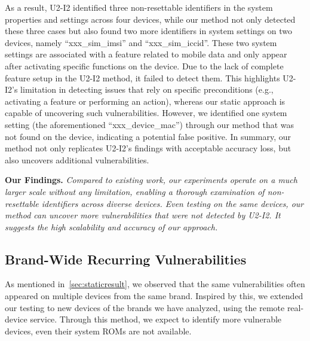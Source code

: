 As a result, U2-I2 identified three non-resettable identifiers in the system properties and settings across four devices, while our method not only detected these three cases but also found two more identifiers in system settings on two devices, namely ``xxx\_sim\_imsi'' and ``xxx\_sim\_iccid''.
These two system settings are associated with a feature related to mobile data and only appear after activating specific functions on the device. 
Due to the lack of complete feature setup in the U2-I2 method, it failed to detect them.
This highlights U2-I2's limitation in detecting issues that rely on specific preconditions (e.g., activating a feature or performing an action), whereas our static approach is capable of uncovering such vulnerabilities.
However, we identified one system setting (the aforementioned ``xxx\_device\_mac'') through our method that was not found on the device, indicating a potential false positive.
In summary, our method not only replicates U2-I2’s findings with acceptable accuracy loss, but also uncovers additional vulnerabilities.

\noindent \textbf{Our Findings.}
\textit{
Compared to existing work, our experiments operate on a much larger scale without any limitation, enabling a thorough examination of non-resettable identifiers across diverse devices.
Even testing on the same devices, our method can uncover more vulnerabilities that were not detected by U2-I2. It suggests the high scalability and accuracy of our approach.
}

\subsection{Brand-Wide Recurring Vulnerabilities}
As mentioned in~\ref{sec:staticresult}, we observed that the same vulnerabilities often appeared on multiple devices from the same brand.
Inspired by this, we extended our testing to \dynamicmodels new devices of the brands we have analyzed, using the remote real-device service.
Through this method, we expect to identify more vulnerable devices, even their system ROMs are not available.

